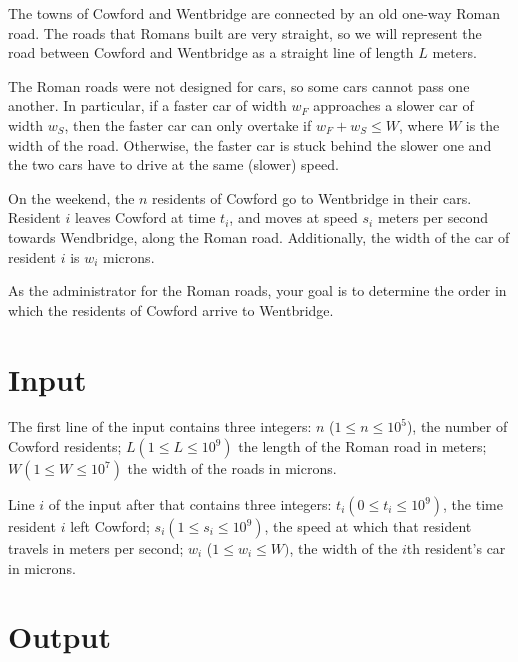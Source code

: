 
The towns of Cowford and Wentbridge are connected by an old one-way Roman road.
The roads that Romans built are very straight, so we will represent the road between Cowford and Wentbridge as a straight line of length $L$ meters.

The Roman roads were not designed for cars, so some cars cannot pass one another.
In particular, if a faster car of width $w_F$ approaches a slower car of width $w_S$, then the faster car can only overtake if $w_F + w_S \leq W$,
where $W$ is the width of the road.
Otherwise, the faster car is stuck behind the slower one and the two cars have to drive at the same (slower) speed.

On the weekend, the $n$ residents of Cowford go to Wentbridge in their cars.
Resident $i$ leaves Cowford at time $t_i$, and moves at speed $s_i$ meters per second towards Wendbridge, along the Roman road.
Additionally, the width of the car of resident $i$ is $w_i$ microns.

As the administrator for the Roman roads, your goal is to determine the order in which the residents of Cowford arrive to Wentbridge.

\section*{Input}
The first line of the input contains three integers: $n$ ($1 \leq n \leq 10^5$), the number of Cowford residents; $L (1 \leq L \leq 10^9)$ the length of the Roman road in meters; $W (1 \leq W \leq 10^7)$ the width of the roads in microns.

Line $i$ of the input after that contains three integers:
$t_i (0 \leq t_i \leq 10^9)$, the time resident $i$ left Cowford;
$s_i (1 \leq s_i \leq 10^9)$, the speed at which that resident travels in meters per second;
$w_i$ ($1 \leq w_i \leq W)$, the width of the $i$th resident's car in microns.

\section*{Output}
